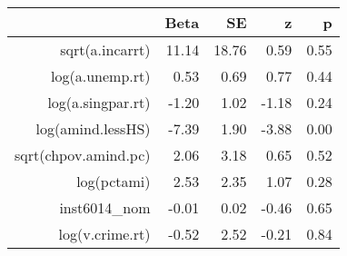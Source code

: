 \begin{table}[ht]
\centering
\begin{tabular}{rrrrr}
  \hline
 & Beta & SE & z & p \\ 
  \hline
sqrt(a.incarrt) & 11.14 & 18.76 & 0.59 & 0.55 \\ 
  log(a.unemp.rt) & 0.53 & 0.69 & 0.77 & 0.44 \\ 
  log(a.singpar.rt) & -1.20 & 1.02 & -1.18 & 0.24 \\ 
  log(amind.lessHS) & -7.39 & 1.90 & -3.88 & 0.00 \\ 
  sqrt(chpov.amind.pc) & 2.06 & 3.18 & 0.65 & 0.52 \\ 
  log(pctami) & 2.53 & 2.35 & 1.07 & 0.28 \\ 
  inst6014\_nom & -0.01 & 0.02 & -0.46 & 0.65 \\ 
  log(v.crime.rt) & -0.52 & 2.52 & -0.21 & 0.84 \\ 
   \hline
\end{tabular}
\end{table}
